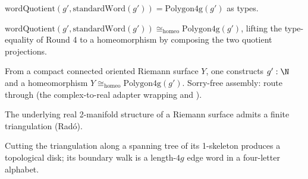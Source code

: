 \begin{lemma}
\label{lem:polygonal-model-phase4-identify-polygon}
$\mathrm{wordQuotient}(g', \mathrm{standardWord}(g')) = \mathrm{Polygon4g}(g')$ as types.
\leanok
\end{lemma}

\begin{lemma}
\label{lem:polygonal-model-phase4-bridge}
$\mathrm{wordQuotient}(g', \mathrm{standardWord}(g')) \cong_{\mathrm{homeo}} \mathrm{Polygon4g}(g')$, lifting the type-equality of Round 4 to a homeomorphism by composing the two quotient projections.
\leanok
\end{lemma}

\begin{lemma}
\label{lem:polygonal-model-some-polygon-homeomorph}
From a compact connected oriented Riemann surface $Y$, one constructs $g' : \N$ and a homeomorphism $Y \cong_{\mathrm{homeo}} \mathrm{Polygon4g}(g')$.
Sorry-free assembly: route through
 (the complex-to-real
adapter wrapping  and
).
\leanok
\end{lemma}

\begin{lemma}
\label{lem:polygonal-model-apply-rado}
The underlying real 2-manifold structure of a Riemann surface admits a finite triangulation (Rad\'o).
\leanok
\end{lemma}

\begin{lemma}
\label{lem:polygonal-model-cut-along-tree}
Cutting the triangulation along a spanning tree of its 1-skeleton produces a topological disk; its boundary walk is a length-$4g$ edge word in a four-letter alphabet.
\leanok
\end{lemma}

